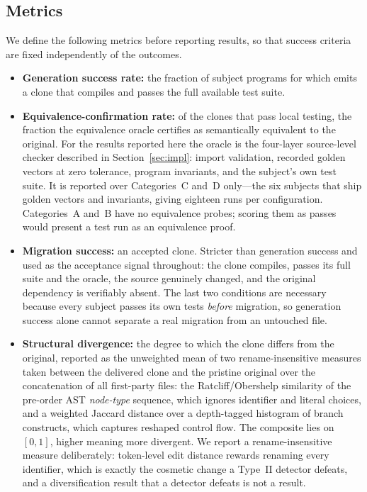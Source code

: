 

\subsection{Metrics}

We define the following metrics before reporting results, so that success criteria are fixed independently of the outcomes.

\begin{itemize}
    \item \textbf{Generation success rate:} the fraction of subject programs for which \sys emits a clone that compiles and passes the full available test suite.
    \item \textbf{Equivalence-confirmation rate:} of the clones that pass local testing, the fraction the equivalence oracle certifies as semantically equivalent to the original. For the results reported here the oracle is the four-layer source-level checker described in Section~\ref{sec:impl}: import validation, recorded golden vectors at zero tolerance, program invariants, and the subject's own test suite. It is reported over Categories~C and~D only---the six subjects that ship golden vectors and invariants, giving eighteen runs per configuration. Categories~A and~B have no equivalence probes; scoring them as passes would present a test run as an equivalence proof.
    \item \textbf{Migration success:} an accepted clone. Stricter than generation success and used as the acceptance signal throughout: the clone compiles, passes its full suite and the oracle, the source genuinely changed, and the original dependency is verifiably absent. The last two conditions are necessary because every subject passes its own tests \emph{before} migration, so generation success alone cannot separate a real migration from an untouched file.
    \item \textbf{Structural divergence:} the degree to which the clone differs from the original, reported as the unweighted mean of two rename-insensitive measures taken between the delivered clone and the pristine original over the concatenation of all first-party files: the Ratcliff/Obershelp similarity of the pre-order AST \emph{node-type} sequence, which ignores identifier and literal choices, and a weighted Jaccard distance over a depth-tagged histogram of branch constructs, which captures reshaped control flow. The composite lies on $[0,1]$, higher meaning more divergent. We report a rename-insensitive measure deliberately: token-level edit distance rewards renaming every identifier, which is exactly the cosmetic change a Type~II detector defeats, and a diversification result that a detector defeats is not a result.

\end{itemize}
